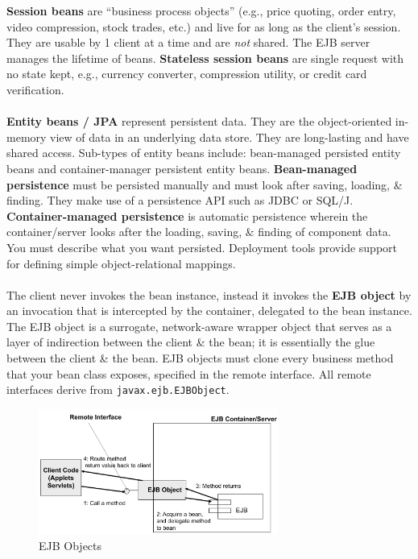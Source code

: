 \documentclass[a4paper,11pt]{article}
\begin{document}
\textbf{Session beans} are ``business process objects'' (e.g., price quoting, order entry, video compression, stock trades, etc.) and live for as long as the client's session.
They are usable by 1 client at a time and are \textit{not} shared.
The EJB server manages the lifetime of beans.
\textbf{Stateless session beans} are single request with no state kept, e.g., currency converter, compression utility, or credit card verification.
\\\\
\textbf{Entity beans / JPA} represent persistent data.
They are the object-oriented in-memory view of data in an underlying data store.
They are long-lasting and have shared access.
Sub-types of entity beans include: bean-managed persisted entity beans and container-manager persistent entity beans.
\textbf{Bean-managed persistence} must be persisted manually and must look after saving, loading, \& finding.
They make use of a persistence API such as JDBC or SQL/J.
\textbf{Container-managed persistence} is automatic persistence wherein the container/server looks after the loading, saving, \& finding of component data.
You must describe what you want persisted.
Deployment tools provide support for defining simple object-relational mappings.
\\\\
The client never invokes the bean instance, instead it invokes the \textbf{EJB object} by an invocation that is intercepted by the container, delegated to the bean instance.
The EJB object is a surrogate, network-aware wrapper object that serves as a layer of indirection between the client \& the bean; it is essentially the glue between the client \& the bean.
EJB objects must clone every business method that your bean class exposes, specified in the remote interface.
All remote interfaces derive from \texttt{javax.ejb.EJBObject}.

\begin{figure}[H]
    \centering
    \includegraphics[width=0.7\textwidth]{./images/ejb_objets.png}
    \caption{ EJB Objects }
\end{figure}
\end{document}
